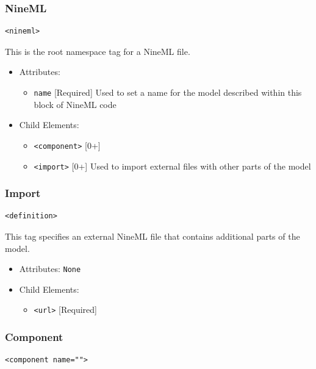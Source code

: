 \documentclass{article}
\begin{document}
\subsubsection{NineML}
%
\begin{lstlisting}
<nineml>
\end{lstlisting}

This is the root namespace tag for a NineML file.

\begin{itemize}
\item Attributes:
%
\begin{itemize}
\item \verb|name| {[}Required{]} Used to set a name for the model
described within this block of NineML code
\end{itemize}

\item Child Elements:
%
\begin{itemize}
\item \verb|<component>| {[}0+{]}
\item \verb|<import>| {[}0+{]} Used to import external files with
other parts of the model
\end{itemize}

\end{itemize}

\subsubsection{Import}
%
\begin{lstlisting}
<definition>
\end{lstlisting}

This tag specifies an external NineML file that contains additional
parts of the model.

\begin{itemize}
\item Attributes: \texttt{None}

\item Child Elements:
%
\begin{itemize}
\item \verb|<url>| {[}Required{]}
\end{itemize}

\end{itemize}

\subsubsection{Component}
%
\begin{lstlisting}
<component name="">
\end{lstlisting}
\end{document}
